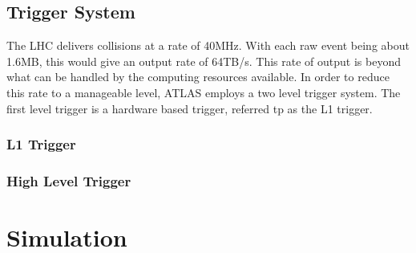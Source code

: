 \subsection{Trigger System}
The LHC delivers collisions at a rate of 40MHz. With each raw event being about 1.6MB, this would give an output rate of 64TB/s. This rate of output is beyond what can be handled by the computing resources available. In order to reduce this rate to a manageable level, ATLAS employs a two level trigger system. The first level trigger is a hardware based trigger, referred tp as the L1 trigger. 
\subsubsection{L1 Trigger}
\subsubsection{High Level Trigger}
\section{Simulation}




